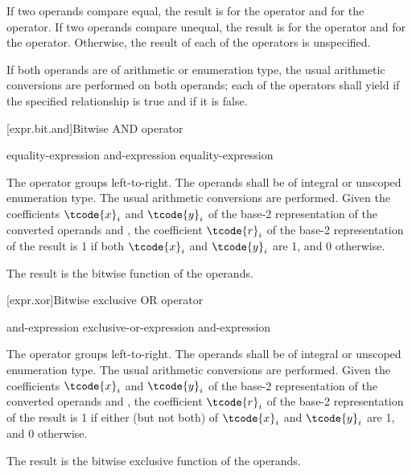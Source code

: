 \pnum
If two operands compare equal, the result is  for
the \tcode{==} operator and  for the \tcode{!=} operator. If two operands
compare unequal, the result is  for the \tcode{==} operator and
 for the \tcode{!=} operator. Otherwise, the result of each of the
operators is unspecified.

\pnum
If both operands are of arithmetic or enumeration type, the usual arithmetic
conversions are performed on both operands; each of the operators shall yield
 if the specified relationship is true and  if it is
false.

[expr.bit.and]{Bitwise AND operator}%
%
%
%
%

\begin{bnf}
\br
    equality-expression\br
    and-expression \terminal{\&} equality-expression
\end{bnf}

\pnum
The \tcode{\&} operator groups left-to-right.
The operands shall be of integral or unscoped enumeration type.
The usual arithmetic conversions are performed.
Given the coefficients $\tcode{x}_i$ and $\tcode{y}_i$
of the base-2 representation
of the converted operands  and ,
the coefficient $\tcode{r}_i$
of the base-2 representation of the result 
is 1 if both $\tcode{x}_i$ and $\tcode{y}_i$ are 1, and 0 otherwise.
\begin{note}
The result is the bitwise  function of the operands.
\end{note}

[expr.xor]{Bitwise exclusive OR operator}%
%
%

\begin{bnf}
\br
    and-expression\br
    exclusive-or-expression \terminal{\caret} and-expression
\end{bnf}

\pnum
The \tcode{\^} operator groups left-to-right.
The operands shall be of integral or unscoped enumeration type.
The usual arithmetic conversions are performed.
Given the coefficients $\tcode{x}_i$ and $\tcode{y}_i$
of the base-2 representation
of the converted operands  and ,
the coefficient $\tcode{r}_i$
of the base-2 representation of the result 
is 1 if either (but not both) of $\tcode{x}_i$ and $\tcode{y}_i$ are 1,
and 0 otherwise.
\begin{note}
The result is the bitwise exclusive  function of the operands.
\end{note}

